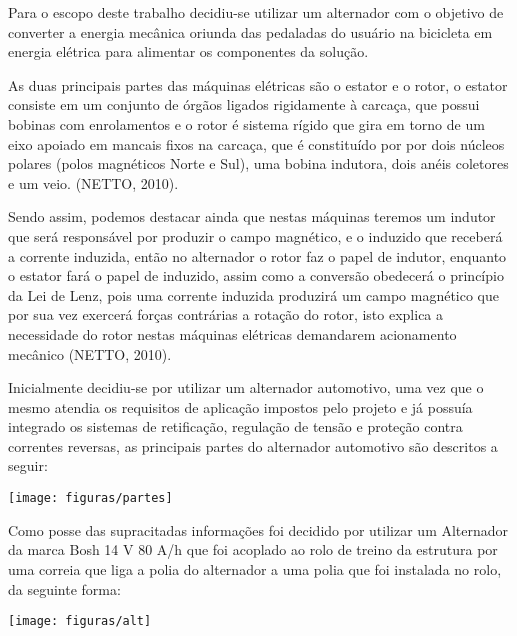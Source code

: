 Para o escopo deste trabalho decidiu-se utilizar um alternador com o objetivo de converter a energia mecânica oriunda das pedaladas do usuário na bicicleta em energia elétrica para alimentar os componentes da solução.

As duas principais partes das máquinas elétricas são o estator e o rotor, o estator consiste em um conjunto de órgãos ligados rigidamente à carcaça, que possui bobinas com enrolamentos e o rotor é sistema rígido que gira em torno de um eixo apoiado em mancais fixos na carcaça, que é constituído por por dois núcleos polares (polos magnéticos Norte e Sul),  uma bobina indutora, dois anéis coletores e um veio. (NETTO, 2010).

Sendo assim, podemos destacar ainda que nestas máquinas teremos um indutor que será responsável por produzir o campo magnético, e o induzido que receberá a corrente induzida, então no alternador o rotor faz o papel de indutor, enquanto o estator fará o papel de induzido, assim como a conversão obedecerá o princípio da Lei de Lenz, pois uma corrente induzida produzirá um campo magnético que por sua vez exercerá forças contrárias a rotação do rotor, isto explica a necessidade do rotor nestas máquinas elétricas demandarem acionamento mecânico (NETTO, 2010).

Inicialmente decidiu-se por utilizar um alternador automotivo, uma vez que o mesmo atendia os requisitos de aplicação impostos pelo projeto e já possuía integrado os sistemas de retificação, regulação de tensão e proteção contra correntes reversas, as principais partes do alternador automotivo são descritos a seguir:

 \begin{center}
    	\texttt{[image: figuras/partes]}
        \label{partes}
    \end{center}


Como posse das supracitadas informações foi decidido por utilizar um Alternador da marca Bosh 14 V 80 A/h que foi acoplado ao rolo de treino da estrutura por uma correia que liga a polia do alternador a uma polia que foi instalada no rolo, da seguinte forma:



 \begin{center}
    	\texttt{[image: figuras/alt]}
        \label{alt}
    \end{center}

